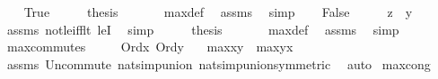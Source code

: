 \begin{isabellebody}
\ \ \isamarkupfalse%
\ True\isanewline
\ \ \isamarkupfalse%
\ \isamarkupfalse%
\ {\isacharquery}{\kern0pt}thesis\ \isanewline
\ \ \ \ \isamarkupfalse%
\ max{\isacharunderscore}{\kern0pt}def\ \isamarkupfalse%
\ assms\ \isamarkupfalse%
\ simp\isanewline
{}\isamarkupfalse%
\isanewline
\ \ \isamarkupfalse%
\ False\isanewline
\ \ \isamarkupfalse%
\ \isamarkupfalse%
\ {\isachardoublequoteopen}z\ {\isasymle}\ y{\isachardoublequoteclose}\ \ \isamarkupfalse%
\ assms\ not{\isacharunderscore}{\kern0pt}le{\isacharunderscore}{\kern0pt}iff{\isacharunderscore}{\kern0pt}lt\ leI\ \isamarkupfalse%
\ simp\isanewline
\ \ \isamarkupfalse%
\ \isamarkupfalse%
\ {\isacharquery}{\kern0pt}thesis\ \isanewline
\ \ \ \ \isamarkupfalse%
\ max{\isacharunderscore}{\kern0pt}def\ \isamarkupfalse%
\ assms\ \isamarkupfalse%
\ simp\ \isanewline
{}\isamarkupfalse%
%
\endisatagproof
{\isafoldproof}%
%
\isadelimproof
\isanewline
%
\endisadelimproof
\isanewline
{}\isamarkupfalse%
\ max{\isacharunderscore}{\kern0pt}commutes\ {\isacharcolon}{\kern0pt}\ \isanewline
\ \ \ {\isachardoublequoteopen}Ord{\isacharparenleft}{\kern0pt}x{\isacharparenright}{\kern0pt}{\isachardoublequoteclose}\ {\isachardoublequoteopen}Ord{\isacharparenleft}{\kern0pt}y{\isacharparenright}{\kern0pt}{\isachardoublequoteclose}\isanewline
\ \ \ {\isachardoublequoteopen}max{\isacharparenleft}{\kern0pt}x{\isacharcomma}{\kern0pt}y{\isacharparenright}{\kern0pt}\ {\isacharequal}{\kern0pt}\ max{\isacharparenleft}{\kern0pt}y{\isacharcomma}{\kern0pt}x{\isacharparenright}{\kern0pt}{\isachardoublequoteclose}\isanewline
%
\isadelimproof
\ \ %
\endisadelimproof
%
\isatagproof
{}\isamarkupfalse%
\ assms\ Un{\isacharunderscore}{\kern0pt}commute\ nat{\isacharunderscore}{\kern0pt}simp{\isacharunderscore}{\kern0pt}union{\isacharparenleft}{\kern0pt}{}{\isacharparenright}{\kern0pt}\ nat{\isacharunderscore}{\kern0pt}simp{\isacharunderscore}{\kern0pt}union{\isacharparenleft}{\kern0pt}{}{\isacharparenright}{\kern0pt}{\isacharbrackleft}{\kern0pt}symmetric{\isacharbrackright}{\kern0pt}\ \isamarkupfalse%
\ auto%
\endisatagproof
{\isafoldproof}%
%
\isadelimproof
\isanewline
%
\endisadelimproof
\isanewline
{}\isamarkupfalse%
\ max{\isacharunderscore}{\kern0pt}cong{}\ {\isacharcolon}{\kern0pt}\isanewline

\end{isabellebody}
